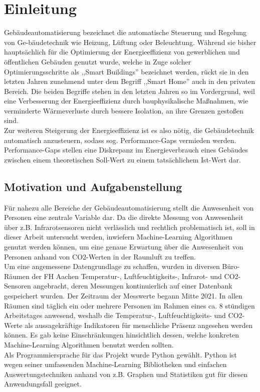 \clearpage
\chapter{\textbf{Einleitung}}\label{einleitung}



Gebäudeautomatisierung bezeichnet die automatische Steuerung und Regelung von Ge-bäudetechnik 
wie Heizung, Lüftung oder Beleuchtung. Während sie bisher hauptsächlich für die Optimierung 
der Energieeffizienz von gewerblichen und öffentlichen Gebäuden genutzt wurde, welche in 
Zuge solcher Optimierungsschritte als ,,Smart Buildings'' bezeichnet werden, 
rückt sie in den letzten Jahren zunehmend unter dem Begriff ,,Smart Home'' auch in den privaten 
Bereich. Die beiden Begriffe stehen in den letzten Jahren so im Vordergrund, weil eine
Verbesserung der Energieeffizienz durch bauphysikalische Maßnahmen, wie verminderte 
Wärmeverluste durch bessere Isolation, an ihre Grenzen gestoßen sind.
\\
Zur weiteren Steigerung der Energieeffizienz ist es also nötig, die Gebäudetechnik
automatisch anzusteuern, sodass sog. Performance-Gaps vermieden werden. Performance-Gaps
stellen eine Diskrepanz im Energieverbrauch eines Gebäudes zwischen einem theoretischen 
Soll-Wert zu einem tatsächlichem Ist-Wert dar. 


\section{Motivation und Aufgabenstellung}

Für nahezu alle Bereiche der Gebäudeautomatisierung stellt die Anwesenheit 
von Personen eine zentrale Variable dar. Da die direkte Messung von Anwesenheit über z.B. 
Infrarotsensoren nicht verlässlich und rechtlich problematisch ist, soll in dieser Arbeit untersucht werden, inwiefern 
Machine-Learning Algorithmen genutzt werden können, um eine genaue Erwartung über 
die Anwesenheit von Personen anhand von CO2-Werten in der Raumluft zu treffen.\\
Um eine angemessene Datengrundlage zu schaffen, wurden in diversen Büro-Räumen der FH Aachen Temperatur-,
Luftfeuchtigkeits-, Infrarot- und CO2-Sensoren angebracht, deren Messungen kontinuierlich auf einer Datenbank
gespeichert wurden. Der Zeitraum der Messwerte begann Mitte 2021. In allen Räumen sind täglich ein oder mehrere
Personen im Rahmen eines ca. 8 stündigen Arbeitstages anwesend, weshalb die Temperatur-, Luftfeuchtigkeits-
und CO2-Werte als aussagekräftige Indikatoren für menschliche Präsenz angesehen werden können.
Es gab keine Einschränkungen hinsichtlich dessen, welche konkreten Machine-Learning Algorithmen 
benutzt werden sollten.\\
Als Programmiersprache für das Projekt wurde Python gewählt. Python ist wegen seiner umfassenden
Machine-Learning Bibliotheken und einfachen Auswertungstechniken anhand von z.B. Graphen und Statistiken 
gut für diesen Anwendungsfall geeignet.




